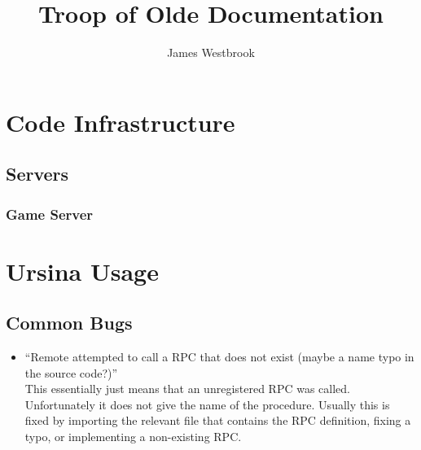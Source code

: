 \documentclass{article}
\title{Troop of Olde Documentation}
\author{James Westbrook}
\begin{document}
\maketitle

\tableofcontents

\pagebreak


\section{Code Infrastructure}
\subsection{Servers}
\subsubsection{Game Server}

\section{Ursina Usage}
\subsection{Common Bugs}
\begin{itemize}
    \item ``Remote attempted to call a RPC that does not exist (maybe a name typo in the source code?)''\\
        This essentially just means that an unregistered RPC was called. Unfortunately it does not give
        the name of the procedure. Usually this is fixed by importing the relevant file that contains the
        RPC definition, fixing a typo, or implementing a non-existing RPC.
\end{itemize}
\end{document}
